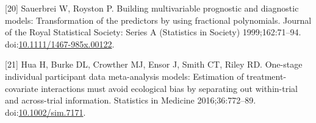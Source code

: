 \documentclass[14pt,]{article}
\begin{document}
\hypertarget{ref-Sauerbrei_1999}{}
{[}20{]} Sauerbrei W, Royston P. Building multivariable prognostic and
diagnostic models: Transformation of the predictors by using fractional
polynomials. Journal of the Royal Statistical Society: Series A
(Statistics in Society) 1999;162:71--94.
doi:\href{https://doi.org/10.1111/1467-985x.00122}{10.1111/1467-985x.00122}.

\hypertarget{ref-Hua_2016}{}
{[}21{]} Hua H, Burke DL, Crowther MJ, Ensor J, Smith CT, Riley RD.
One-stage individual participant data meta-analysis models: Estimation
of treatment-covariate interactions must avoid ecological bias by
separating out within-trial and across-trial information. Statistics in
Medicine 2016;36:772--89.
doi:\href{https://doi.org/10.1002/sim.7171}{10.1002/sim.7171}.
\end{document}
